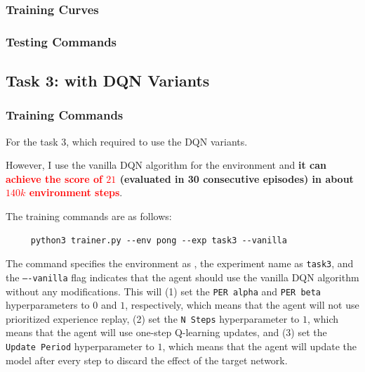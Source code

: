 \subsubsection{Training Curves}

\subsubsection{Testing Commands}

\subsection{Task 3: \pong with DQN Variants}

\subsubsection{Training Commands}

For the task 3, which required to use the DQN variants.

However, I use the vanilla DQN algorithm for the \pong environment and \textbf{it can \textcolor{red}{achieve the score of $21$} (evaluated in 30 consecutive episodes) in about \textcolor{red}{$140k$ environment steps}}.

The training commands are as follows:

\begin{verbatim}
     python3 trainer.py --env pong --exp task3 --vanilla
\end{verbatim}

The command specifies the environment as \pong, the experiment name as \texttt{task3}, and the \texttt{----vanilla} flag indicates that the agent should use the vanilla DQN algorithm without any modifications. This will (1) set the \texttt{PER alpha} and \texttt{PER beta} hyperparameters to $0$ and $1$, respectively, which means that the agent will not use prioritized experience replay, (2) set the \texttt{N Steps} hyperparameter to $1$, which means that the agent will use one-step Q-learning updates, and (3) set the \texttt{Update Period} hyperparameter to $1$, which means that the agent will update the model after every step to discard the effect of the target network.

